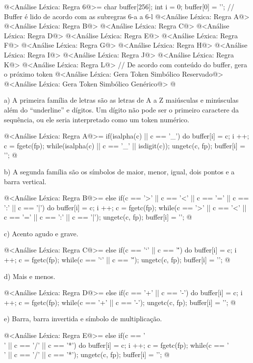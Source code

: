 \iniciocodigo
@<Análise Léxica: Regra 6@>=
{
  char buffer[256];
  int i = 0;
  buffer[0] = '\0';
  // Buffer é lido de acordo com as subregras 6-a a 6-l
  @<Análise Léxica: Regra A@>
  @<Análise Léxica: Regra B@>
  @<Análise Léxica: Regra C@>
  @<Análise Léxica: Regra D@>
  @<Análise Léxica: Regra E@>
  @<Análise Léxica: Regra F@>
  @<Análise Léxica: Regra G@>
  @<Análise Léxica: Regra H@>
  @<Análise Léxica: Regra I@>
  @<Análise Léxica: Regra J@>
  @<Análise Léxica: Regra K@>
  @<Análise Léxica: Regra L@>
  // De acordo com conteúdo do buffer, gera o próximo token
  @<Análise Léxica: Gera Token Simbólico Reservado@>
  @<Análise Léxica: Gera Token Simbólico Genérico@>
}
@
\fimcodigo


a) A primeira família de letras são as letras de A a Z maiúsculas e
minúsculas além do ``underline'' e dígitos. Um dígito não pode ser o
primeiro caractere da sequência, ou ele seria interpretado como um
token numérico.

\iniciocodigo
@<Análise Léxica: Regra A@>=
if(isalpha(c) || c == '_'){
  do{
    buffer[i] = c;
    i ++;
    c = fgetc(fp);
  } while(isalpha(c) || c == '_' || isdigit(c));
  ungetc(c, fp);
  buffer[i] = '\0';
}
@
\fimcodigo

b) A segunda família são os símbolos de maior, menor, igual, dois
pontos e a barra vertical.

\iniciocodigo
@<Análise Léxica: Regra B@>=
else if(c == '>' || c == '<' || c == '=' || c == ':' || c == '|'){
  do{
    buffer[i] = c;
    i ++;
    c = fgetc(fp);
  } while(c == '>' || c == '<' || c == '=' || c == ':' || c == '|');
  ungetc(c, fp);
  buffer[i] = '\0';
}
@
\fimcodigo

c) Acento agudo e grave.

\iniciocodigo
@<Análise Léxica: Regra C@>=
else if(c == '`' || c == '\''){
  do{
    buffer[i] = c;
    i ++;
    c = fgetc(fp);
  } while(c == '`' || c == '\'');
  ungetc(c, fp);
  buffer[i] = '\0';
}
@
\fimcodigo

d) Mais e menos.

\iniciocodigo
@<Análise Léxica: Regra D@>=
else if(c == '+' || c == '-'){
  do{
    buffer[i] = c;
    i ++;
    c = fgetc(fp);
  } while(c == '+' || c == '-');
  ungetc(c, fp);
  buffer[i] = '\0';
}
@
\fimcodigo

e) Barra, barra invertida e símbolo de multiplicação.

\iniciocodigo
@<Análise Léxica: Regra E@>=
else if(c == '\\' || c == '/' || c == '*'){
  do{
    buffer[i] = c;
    i ++;
    c = fgetc(fp);
  } while(c == '\\' || c == '/' || c == '*');
  ungetc(c, fp);
  buffer[i] = '\0';
}
@
\fimcodigo

